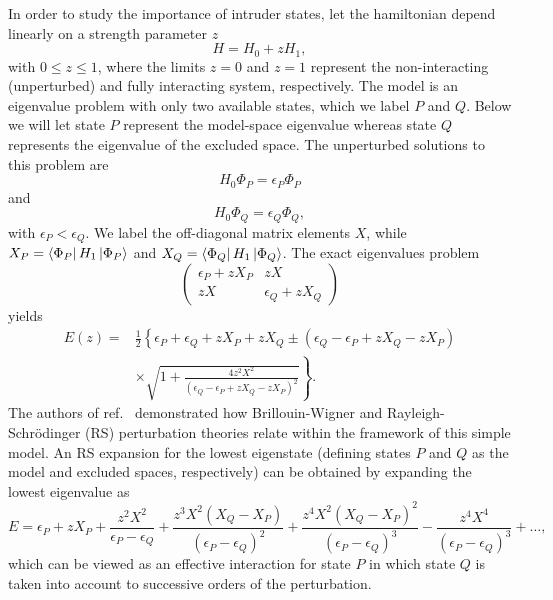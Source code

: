 In order to study the importance of intruder states, let
the hamiltonian depend linearly on a strength parameter $z$
\[
       H=H_0+zH_1,
\]
with $0\leq z\leq1$, where the limits $z=0$ and $z=1$ represent the 
non-interacting (unperturbed) and fully interacting system, respectively.
The model is an eigenvalue
problem with only two available states, which we label
$P$ and $Q$. Below we will let 
state $P$ represent the model-space
eigenvalue whereas state $Q$ represents 
the eigenvalue of the excluded space.
The unperturbed solutions to this problem are
\begin{equation}
       H_0\Phi_P =\epsilon_P\Phi_P
\end{equation}
and
\begin{equation}
       H_0\Phi_Q =\epsilon_Q\Phi_Q,
\end{equation}
with $\epsilon_P < \epsilon_Q$. We label the off-diagonal
matrix elements $X$, while $X_P=\left\langle \Phi_P \right|H_1\left| \Phi_P \right\rangle$ and
$X_Q=\left\langle \Phi_Q \right|H_1\left| \Phi_Q \right\rangle$.
The exact eigenvalues problem
\begin{equation}
\left(\begin{array}{cc}\epsilon_P+zX_P &zX \\
zX &\epsilon_Q+zX_Q \end{array}\right)
\end{equation}
yields
\begin{eqnarray}
     \label{eq:exact}
     E(z)=&\frac{1}{2}\left\{\epsilon_P +\epsilon_Q +zX_P
     +zX_Q \pm \left(
     \epsilon_Q -\epsilon_P +zX_Q-zX_P\right) \right. \\ \nonumber
     & \left. \times\sqrt{1+\frac{4z^2X^2}{\left(
     \epsilon_Q -\epsilon_P +zX_Q-zX_P\right)^2}}
     \right\}.
\end{eqnarray}
The authors of ref.\ \cite{eo77}
demonstrated how Brillouin-Wigner and
Rayleigh-Schr\"{o}dinger (RS) perturbation theories relate
within the framework of this simple model.
An RS expansion for the lowest
eigenstate (defining states $P$ and $Q$ as the model and excluded
spaces, respectively) can be obtained by expanding the lowest
eigenvalue as
\begin{equation}
      E=\epsilon_P +zX_P+\frac{z^2X^2}{\epsilon_P -\epsilon_Q}+
      \frac{z^3X^2(X_Q-X_P)}{(\epsilon_P -\epsilon_Q)^2}+
      \frac{z^4X^2(X_Q-X_P)^2}{(\epsilon_P -\epsilon_Q)^3}
      -\frac{z^4X^4}{(\epsilon_P -\epsilon_Q)^3}+\dots,
      \label{eq:modela}
\end{equation}
which can be viewed as an effective interaction for state $P$ in which
state $Q$ is taken into account to successive orders of the perturbation.
